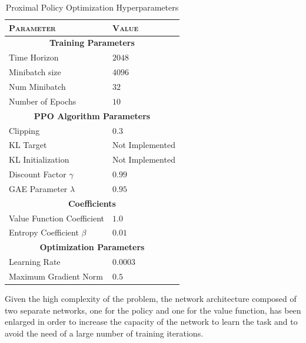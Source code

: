 \begin{table}[h]
    \centering
    \label{tab:ppohyperparameters}
    \begin{tabular}{ll}
        \toprule
        \textsc{Parameter}          & \textsc{Value}          \\
        \midrule
        \multicolumn{2}{c}{\textbf{Training Parameters}}      \\
        Time Horizon                & $2048$                  \\
        Minibatch size              & $4096$                  \\
        Num Minibatch               & $32$                    \\
        Number of Epochs            & $10$                    \\
        \midrule
        \multicolumn{2}{c}{\textbf{PPO Algorithm Parameters}} \\
        Clipping                    & $0.3$                   \\
        KL Target                   & Not Implemented         \\
        KL Initialization           & Not Implemented         \\
        Discount Factor $\gamma$    & $0.99$                  \\
        GAE Parameter $\lambda$     & $0.95$                  \\
        \midrule
        \multicolumn{2}{c}{\textbf{Coefficients}}             \\
        Value Function Coefficient  & $1.0$                   \\
        Entropy Coefficient $\beta$ & $0.01$                  \\
        \midrule
        \multicolumn{2}{c}{\textbf{Optimization Parameters}}  \\
        Learning Rate               & $0.0003$                \\
        Maximum Gradient Norm       & $0.5$                   \\
        \bottomrule
    \end{tabular}
    \caption{Proximal Policy Optimization Hyperparameters}
\end{table}

Given the high complexity of the problem, the network architecture composed of two separate networks, one for the policy and one for the value function, has been enlarged in order to increase the capacity of the network to learn the task and to avoid the need of a large number of training iterations.


